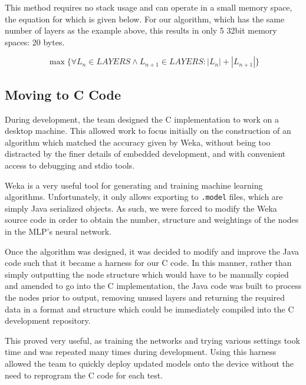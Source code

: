 This method requires no stack usage and can operate in a small memory space, the equation for which is given below. For our algorithm, which has the same number of layers as the example above, this results in only 5 32bit memory spaces: 20 bytes.

\begin{equation}
\label{eq:algo-size}
\max\{\forall L_n \in LAYERS \wedge L_{n+1} \in LAYERS : |L_n|+|L_{n+1}|\}
\end{equation}

\subsection{Moving to C Code}

During development, the team designed the C implementation to work on a desktop machine. This allowed work to focus initially on the construction of an algorithm which matched the accuracy given by Weka, without being too distracted by the finer details of embedded development, and with convenient access to debugging and stdio tools. 

Weka is a very useful tool for generating and training machine learning algorithms. Unfortunately, it only allows exporting to \verb|.model| files, which are simply Java serialized objects. As such, we were forced to modify the Weka source code in order to obtain the number, structure and weightings of the nodes in the MLP's neural network.

Once the algorithm was designed, it was decided to modify and improve the Java code such that it became a harness for our C code. In this manner, rather than simply outputting the node structure which would have to be manually copied and amended to go into the C implementation, the Java code was built to process the nodes prior to output, removing unused layers and returning the required data in a format and structure which could be immediately compiled into the C development repository.

This proved very useful, as training the networks and trying various settings took time and was repeated many times during development. Using this harness allowed the team to quickly deploy updated models onto the device without the need to reprogram the C code for each test. 

